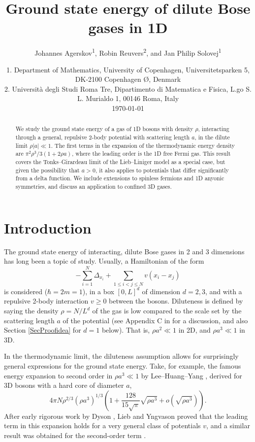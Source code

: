 \documentclass[a4paper,11pt]{article}
\author{Johannes Agerskov\textsuperscript{1}, Robin Reuvers\textsuperscript{2}, and Jan Philip Solovej\textsuperscript{1}}
\date{
1. Department of Mathematics, University of Copenhagen, Universitetsparken 5, DK-2100 Copenhagen \O, Denmark
	\\
2. Universit\`{a} degli Studi Roma Tre, Dipartimento di Matematica e Fisica, L.go S. L. Murialdo 1, 00146 Roma, Italy\\
	\today}
\title{Ground state energy of dilute Bose gases in 1D}
\numberwithin{equation}{section}
\begin{document}
	\maketitle
	\begin{abstract}
		We study the ground state energy of a gas of 1D bosons with density $\rho$, interacting through a general, repulsive 2-body potential with scattering length $a$, in the dilute limit $\rho |a|\ll1$. The first terms in the expansion of the thermodynamic energy density are $\pi^2\rho^3/3(1+2\rho a)$, where the leading order is the 1D free Fermi gas. This result covers the Tonks--Girardeau limit of the Lieb--Liniger model as a special case, but given the possibility that $a>0$, it also applies to potentials that differ significantly from a delta function. We include extensions to spinless fermions and 1D anyonic symmetries, and discuss an application to confined 3D gases.
	\end{abstract}
	
	
	\section{Introduction}
	The ground state energy of interacting, dilute Bose gases in 2 and 3 dimensions has long been a topic of study. Usually, a Hamiltonian of the form 
	\begin{equation}
		\label{Hgeneral}
		-\sum^N_{i=1}\Delta_{x_i}+\sum_{1\leq i<j\leq N}v(x_i-x_j)
	\end{equation}
	is considered ($\hbar=2m=1$), in a box $[0,L]^d$ of dimension $d=2,3$, and with a repulsive 2-body interaction $v\geq0$ between the bosons. Diluteness is defined by saying the density $\rho=N/L^d$ of the gas is low compared to the scale set by the scattering length $a$ of the potential (see Appendix C in \cite{lieb2006mathematics} for a discussion, and also Section \ref{SecProofidea} for $d=1$ below). That is, $\rho a^2\ll1$ in 2D, and $\rho a^3\ll1$ in 3D.
	
	In the thermodynamic limit, the diluteness assumption allows for surprisingly general expressions for the ground state energy. Take, for example, the famous energy expansion to second order in $\rho a^3\ll1$ by Lee--Huang--Yang \cite{lee1957eigenvalues}, derived for 3D bosons with a hard core of diameter $a$,
	\begin{equation}
		\label{result3D}
		4\pi N\rho^{2/3} (\rho a^3)^{1/3}\left(1+\frac{128}{15\sqrt{\pi}}\sqrt{\rho a^3}+o\left(\sqrt{\rho a^3}\right)\right).
	\end{equation}
	After early rigorous work by Dyson \cite{dyson1957ground}, Lieb and Yngvason \cite{lieb1998ground} proved that the leading term in this expansion holds for a very general class of potentials $v$, and a similar result was obtained for the second-order term \cite{yau2009second,fournais2020energy,basti2021new,fournais2021energy}.
	
\end{document}
